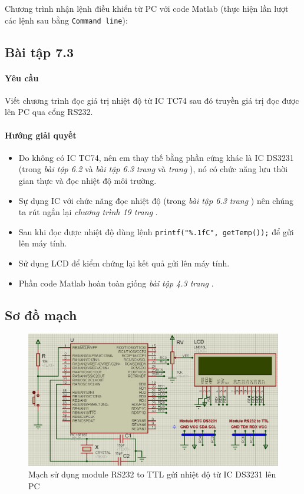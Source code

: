 Chương trình nhận lệnh điều khiển từ PC với code Matlab (thực hiện lần lượt các lệnh sau bằng \verb|Command line|):

\subsection{Bài tập 7.3}
\paragraph{Yêu cầu}Viết chương trình đọc giá trị nhiệt độ từ IC TC74 sau đó truyền giá trị đọc được lên PC qua cổng RS232.
\paragraph{Hướng giải quyết}
\begin{itemize}
\item Do không có IC TC74, nên em thay thế bằng phần cứng khác là IC DS3231 (trong \textit{bài tập 6.2} và \textit{bài tập 6.3} \textit{trang \pageref{Ex:ds3231-1}} và \textit{trang \pageref{Ex:ds3231-2}}), nó có chức năng lưu thời gian thực và đọc nhiệt độ môi trường. 
\item Sự dụng IC với chức năng đọc nhiệt độ (trong \textit{bài tập 6.3 trang \pageref{Ex:ds3231-2}}) nên chúng ta rút ngắn lại \textit{chương trình 19 trang \pageref{code-19}}.
\item Sau khi đọc được nhiệt độ dùng lệnh \verb|printf("%.1fC", getTemp());| để gửi lên máy tính.
\item Sử dụng LCD để kiểm chứng lại kết quả gửi lên máy tính.
\item Phần code Matlab hoàn toàn giống \textit{bài tập 4.3 trang \pageref{Ex:4-3}}.
\end{itemize}
\newpage
\subsection*{Sơ đồ mạch}
\begin{figure}[!h]
\begin{center}
\includegraphics[scale=0.5]{bai-7/image/BAI-7-3}
\end{center}
\caption{Mạch sử dụng module RS232 to TTL gửi nhiệt độ từ IC DS3231 lên PC}
\end{figure}
